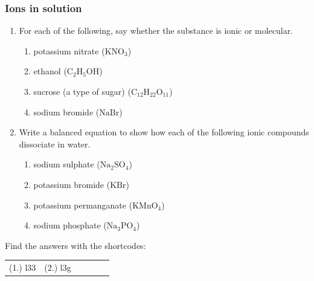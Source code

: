             \subsubsection{ Ions in solution         }
            \nopagebreak
            \label{m38720*id336094}\begin{enumerate}[noitemsep, label=\textbf{\arabic*}. ] 
            \label{m38720*uid22}\item For each of the following, say whether the substance is ionic or molecular.
\label{m38720*id336110}\begin{enumerate}[noitemsep, label=\textbf{\alph*}. ] 
            \label{m38720*uid23}\item potassium nitrate ($\mathrm{KNO}{}_{3}$)
\label{m38720*uid24}\item ethanol ($\mathrm{C}{}_{2}\mathrm{H}{}_{5}\mathrm{OH}$)
\label{m38720*uid25}\item sucrose (a type of sugar) ($\mathrm{C}{}_{12}\mathrm{H}{}_{22}\mathrm{O}{}_{11}$)\label{m38720*uid26}\item sodium bromide ($\mathrm{NaBr}$)
\end{enumerate}
\label{m38720*uid27}\item Write a balanced equation to show how each of the following ionic compounds dissociate in water.
\label{m38720*id336252}\begin{enumerate}[noitemsep, label=\textbf{\alph*}. ] 
            \label{m38720*uid28}\item sodium sulphate ($\mathrm{Na}{}_{2}\mathrm{SO}{}_{4}$)
\label{m38720*uid29}\item potassium bromide ($\mathrm{KBr}$)
\label{m38720*uid30}\item potassium permanganate ($\mathrm{KMnO}{}_{4}$)
\label{m38720*uid31}\item sodium phosphate ($\mathrm{Na}{}_{3}\mathrm{PO}{}_{4}$)
\end{enumerate}
\end{enumerate}
      \label{m38720*uid32}
\par {} Find the answers with the shortcodes:
 \par \begin{tabular}[h]{cccccc}
 (1.) l33  &  (2.) l3g  & \end{tabular}
